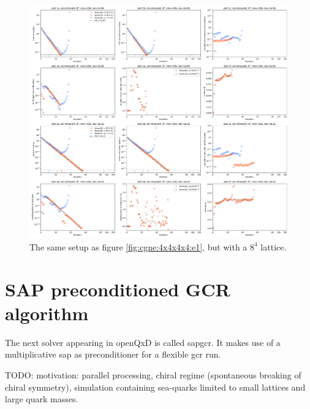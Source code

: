 \documentclass{article}
\theoremstyle{plain} %
\theoremstyle{convention} %
\theoremstyle{remark} %
\numberwithin{equation}{section}
\begin{document}
\begin{figure}[h]
    \centering
    \includegraphics[width=1.0\textwidth]{plots/cgne_8x8x8x8_e1}
    \caption{The same setup as figure \ref{fig:cgne:4x4x4x4:e1}, but with a $8^4$ lattice.}
    \label{fig:cgne:8x8x8x8:e1}
\end{figure}

\section{SAP preconditioned GCR algorithm}

The next solver appearing in openQxD is called \acrshort{sapgcr}. It makes use of a multiplicative \acrfull{sap} as preconditioner for a flexible \acrfull{gcr} run.

TODO: motivation: parallel processing, chiral regime (spontaneous breaking of chiral symmetry), simulation containing sea-quarks limited to small lattices and large quark masses.
\end{document}
